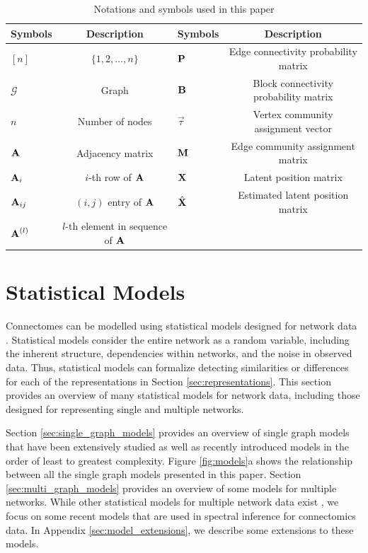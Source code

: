 \begin{table}
\caption{Notations and symbols used in this paper}\label{tab1}
\begin{center}
\begin{tabular}{|@{}l|c@{}|@{}l|c@{}|}
\hline
Symbols & Description & Symbols & Description\\
\hline
$[n]$ & $\{1, 2, \ldots, n\}$ & $\operatorname{\mathbf{P}}$ & Edge connectivity probability matrix\\
$\mathcal{G}$ & Graph & $\operatorname{\mathbf{B}}$ & Block connectivity probability matrix\\
$n$ & Number of nodes & $\vec{\tau}$ & Vertex community assignment vector\\
$\operatorname{\mathbf{A}}$ & Adjacency matrix & $\operatorname{\mathbf{M}}$ & Edge community assignment matrix\\
$\operatorname{\mathbf{A}}_i$ & $i$-th row of $\operatorname{\mathbf{A}}$ & $\operatorname{\mathbf{X}}$ & Latent position matrix\\
$\operatorname{\mathbf{A}}_{ij}$ & $(i,j)$ entry of $\operatorname{\mathbf{A}}$ & $\hat{\operatorname{\mathbf{X}}}$ & Estimated latent position matrix\\
$\operatorname{\mathbf{A}}^{(l)}$ & $l$-th element in sequence of $\operatorname{\mathbf{A}}$ & &\\
\hline
\end{tabular}
\end{center}
\end{table}

\section{Statistical Models}\label{sec:models}
Connectomes can be modelled using statistical models designed for network data \cite{ goldenberg2010survey, kolaczyk2014statistical}. Statistical models consider the entire network as a random variable, including the inherent structure, dependencies within networks, and the noise in observed data. 
Thus, statistical models can formalize detecting similarities or differences for each of the representations in Section \ref{sec:representations}.
This section provides an overview of many statistical models for network data, including those designed for representing single and multiple networks. 

Section \ref{sec:single_graph_models} provides an overview of single graph models that have been extensively studied as well as recently introduced models in the order of least to greatest complexity. Figure \ref{fig:models}a shows the relationship between all the single graph models presented in this paper. Section \ref{sec:multi_graph_models} provides an overview of some models for multiple networks. While other statistical models for multiple network data exist \cite{zhang2018network, wang2019joint, nielsen2018multiple, Durante2017-fz}, we focus on  some recent models that are used in spectral inference for connectomics data. In Appendix \ref{sec:model_extensions}, we describe some extensions to these models. 

